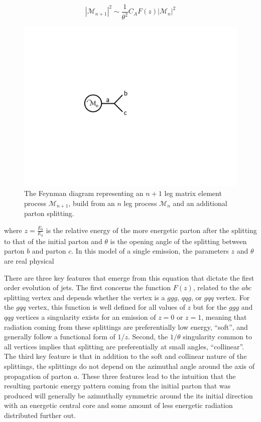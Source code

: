 \documentclass[UKenglish,texlive=2016]{\ATLASLATEXPATH atlasdoc}
\begin{document}
\begin{equation}
|\mathcal{M}_{n+1}|^2 \sim \frac{1}{\theta^{2}} C_{A} F(z) |\mathcal{M}_{n}|^2
\end{equation}

\begin{figure}[!ht]
 \centering
 \includegraphics[width=0.3\columnwidth]{figures/diagram}
 \caption{The Feynman diagram representing an $n+1$ leg matrix element process $\mathcal{M}_{n+1}$, build from an $n$ leg process $\mathcal{M}_{n}$ and an additional parton splitting.
 \label{fig:diagrams}}
\end{figure}

\noindent
where $z=\frac{E_{b}}{E_{a}}$ is the relative energy of the more energetic parton after the splitting to that of the initial parton and $\theta$ is the opening angle of the splitting between parton $b$ and parton $c$.  In this model of a single emission, the parameters $z$ and $\theta$ are real physical


There are three key features that emerge from this equation that dictate the first order evolution of jets.  The first concerns the function $F(z)$, related to the $abc$ splitting vertex and depends whether the vertex is a $ggg$, $qqg$, or $gqq$ vertex.  For the $gqq$ vertex, this function is well defined for all values of $z$ but for the $ggg$ and $qqg$ vertices a singularity exists for an emission of $z=0$ or $z=1$, meaning that radiation coming from these splittings are preferentially low energy, ``soft'', and generally follow a functional form of $1/z$.  Second, the $1/\theta$ singularity common to all vertices implies that splitting are preferentially at small angles, ``collinear''.  The third key feature is that in addition to the soft and collinear nature of the splittings, the splittings do not depend on the azimuthal angle around the axis of propagation of parton $a$.  These three features lead to the intuition that the resulting partonic energy pattern coming from the initial parton that was produced will generally be azimuthally symmetric around the its initial direction with an energetic central core and some amount of less energetic radiation distributed further out.
\end{document}
